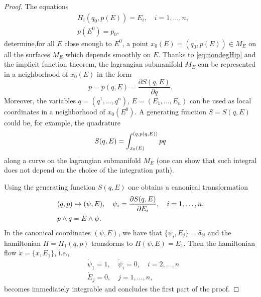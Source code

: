 \documentclass[english,fontsize=11pt,paper=a5,oneside]{scrbook}
\let\d\relax
\DeclareMathOperator{\d}{d}
\theoremstyle{definition}
\begin{document}
\begin{proof}
    The equations
    \begin{align}
        &H_i(q_0, p(E)) = E_i,\quad i = 1,\ldots,n,\\
        &p(E^0) = p_0,
    \end{align}
    determine,for all $E$ close enough to $E^0$, a point $x_0(E) = (q_0, p(E))\in M_E$ on all the surfaces $M_E$ which depends smoothly on $E$.
    Thanks to \eqref{eq:nondegHip} and the implicit function theorem, the lagrangian submanifold $M_E$ can be represented in a neighborhood of $x_0(E)$ in the form
    \begin{equation}
        p = p(q,E) = \frac{\partial S(q,E)}{\partial q}.
    \end{equation}
    Moreover, the variables $q=(q^1, \ldots, q^n)$, $E= (E_1,\ldots,E_n)$ can be used as local coordinates in a neighborhood of $x_0(E^0)$. A generating function $S=S(q,E)$ could be, for example, the quadrature
    \begin{equation}
        S(q,E) = \int_{x_0(E)}^{(q,p(q,E))} p \d q
    \end{equation}
    along a curve on the lagrangian submanifold $M_E$ (one can show that such integral does not depend on the choice of the integration path).

    Using the generating function $S(q,E)$ one obtains a canonical transformation
    \begin{align}
        &(q,p)\mapsto (\psi, E), \quad \psi_i = \frac{\partial S(q,E)}{\partial E_i}, \quad i=1,\ldots,n,\\
        & \d p \wedge \d q = \d E \wedge \d \psi.
    \end{align}
    In the canonical coordinates $(\psi, E)$, we have that $\{\psi_i, E_j\} = \delta_{ij}$ and the hamiltonian $H = H_1(q,p)$ transforms to $H(\psi, E) = E_1$. Then the hamiltonian flow $\dot x = \{x, E_1\}$, i.e.,
    \begin{align}
        &\dot \psi_1 = 1, \quad \dot \psi_i = 0, \quad i=2,\ldots,n\\
        &\dot E_j = 0, \quad j = 1,\ldots, n,
    \end{align}
    becomes immediately integrable and concludes the first part of the proof.
    \medskip


\end{proof}
\end{document}
